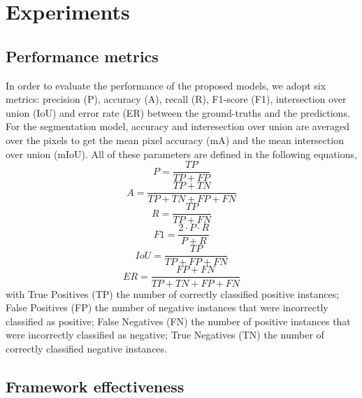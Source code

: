 \documentclass[amt, article]{copernicus}
\begin{document}
\section{Experiments}

\subsection{Performance metrics}

In order to evaluate the performance of the proposed models, we adopt six metrics: precision (P), accuracy (A), recall (R), F1-score (F1), intersection over union (IoU) and error rate (ER) between the ground-truths and the predictions. For the segmentation model, accuracy and interesection over union are averaged over the pixels to get the mean pixel accuracy (mA) and the mean intersection over union (mIoU). All of these parameters are defined in the following equations,
\begin{equation}
    P = \frac{TP}{TP + FP}
\end{equation}
\begin{equation}
    A = \frac{TP + TN}{TP + TN + FP + FN}
\end{equation}
\begin{equation}
    R = \frac{TP}{TP + FN}
\end{equation}
\begin{equation}
    F1 = \frac{2 \cdot P \cdot R}{P + R}
\end{equation}
\begin{equation}
    IoU = \frac{TP}{TP + FP + FN}
\end{equation}
\begin{equation}
    ER = \frac{FP + FN}{TP + TN + FP + FN}
\end{equation}
with True Positives (TP) the number of correctly classified positive instances; False Positives (FP) the number of negative instances that were incorrectly classified as positive; False Negatives (FN) the number of positive instances that were incorrectly classified as negative; True Negatives (TN) the number of correctly classified negative instances.

\subsection{Framework effectiveness}
\end{document}
